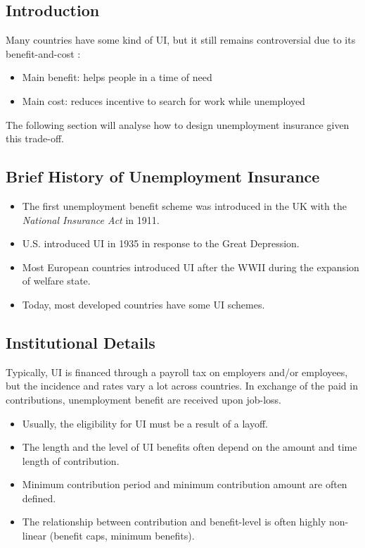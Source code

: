     \subsection{Introduction}
        Many countries have some kind of UI, but it still remains controversial due to its benefit-and-cost :
        \begin{itemize}
            \item Main benefit: helps people in a time of need
            \item Main cost: reduces incentive to search for work while unemployed
        \end{itemize}
        The following section will analyse how to design unemployment insurance given this trade-off.
        
    \subsection{Brief History of Unemployment Insurance}
        \begin{itemize}
            \item The first unemployment benefit scheme was introduced in the UK with the \textit{National Insurance Act} in 1911.
            \item U.S. introduced UI in 1935 in response to the Great Depression.
            \item Most European countries introduced UI after the WWII during the expansion of welfare state.
            \item Today, most developed countries have some UI schemes.
        \end{itemize}
        
    \subsection{Institutional Details}
        Typically, UI is financed through a payroll tax on employers and/or employees, but the incidence and rates vary a lot across countries. In exchange of the paid in contributions, unemployment benefit are received upon job-loss.
        \begin{itemize}
            \item Usually, the eligibility for UI must be a result of a layoff.
            \item The length and the level of UI benefits often depend on the amount and time length of contribution.
            \item Minimum contribution period and minimum contribution amount are often defined.
            \item The relationship between contribution and benefit-level is often highly non-linear (benefit caps, minimum benefits).
        \end{itemize}
        
